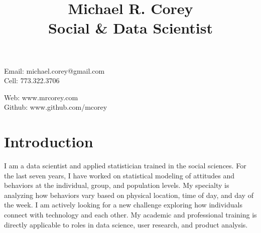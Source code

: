 \documentclass[letter]{article}
\title{\huge \textbf{Michael R. Corey} \\ \large \textbf{Social \& Data Scientist}}
\author{}
\date{}
\begin{document}
\maketitle
\vspace{-4em}

\begin{minipage}[ht]{0.58\textwidth}
	 Email: michael.corey@gmail.com\\ Cell: 773.322.3706\\ 
\end{minipage}
\begin{minipage}[ht] {0.40\textwidth}
	 Web: www.mrcorey.com\\  Github: www.github.com/mcorey \end{minipage}

\section*{Introduction}
I am a data scientist and applied statistician trained in the social sciences. For the last seven years, I have worked on statistical modeling of attitudes and behaviors at the individual, group, and population levels. My specialty is analyzing how behaviors vary based on physical location, time of day, and day of the week. I am actively looking for a new challenge exploring how individuals connect with technology and each other. My academic and professional training is directly applicable to roles in data science, user research, and product analysis.

\end{document}
